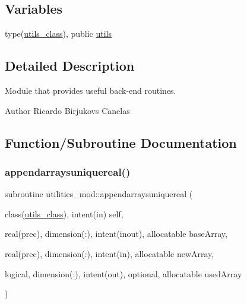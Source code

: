 \subsection*{Variables}
\begin{DoxyCompactItemize}
\item 
type(\mbox{\hyperlink{structutilities__mod_1_1utils__class}{utils\+\_\+class}}), public \mbox{\hyperlink{namespaceutilities__mod_aa12c2506b3107528a2511d059186f12d}{utils}}
\end{DoxyCompactItemize}


\subsection{Detailed Description}
Module that provides useful back-\/end routines. 

\begin{DoxyAuthor}{Author}
Ricardo Birjukovs Canelas 
\end{DoxyAuthor}


\subsection{Function/\+Subroutine Documentation}
\mbox{\label{namespaceutilities__mod_abffd01c3faf22f44e260c42c6f95d5c4}} 
\subsubsection{\texorpdfstring{appendarraysuniquereal()}{appendarraysuniquereal()}}
{\footnotesize\ttfamily subroutine utilities\+\_\+mod\+::appendarraysuniquereal (\begin{DoxyParamCaption}\item[{class(\mbox{\hyperlink{structutilities__mod_1_1utils__class}{utils\+\_\+class}}), intent(in)}]{self,  }\item[{real(prec), dimension(\+:), intent(inout), allocatable}]{base\+Array,  }\item[{real(prec), dimension(\+:), intent(in), allocatable}]{new\+Array,  }\item[{logical, dimension(\+:), intent(out), optional, allocatable}]{used\+Array }\end{DoxyParamCaption})\hspace{0.3cm}{\ttfamily [private]}}



